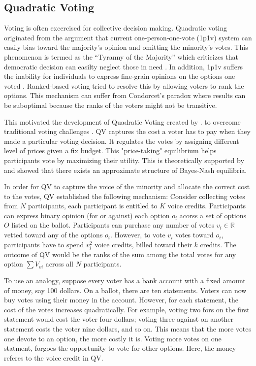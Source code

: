 \subsection{Quadratic Voting}
Voting is often excercised
for collective decision making.
Quadratic voting originated 
from the argument
that current one-person-one-vote (1p1v) system
can easily bias toward the majority's opinion
and omitting the minority's votes.
This phenomenon is termed as 
the ``Tyranny of the Majority''
which criticizes that democratic decision
can easilty neglect those in need 
\cite{posner2018radical}.
In addition, 1p1v suffers the inability
for individuals to express fine-grain opinions
on the options one voted \cite{sep-voting-methods}.
Ranked-based voting tried to resolve this
by allowing voters to rank the options.
This mechanism can
suffer from Condorcet's paradox 
where results can be suboptimal 
because the ranks of the voters
might not be transitive\cite{easley2012networks, sep-voting-methods}.

This motivated the development of Quadratic Voting
created by \textcite{posner2018radical}. 
to overcome traditional voting challenges .
QV captures the cost a voter has to pay
when they made a particular voting decision.
It regulates the votes by assigning different level of prices
given a fix budget.
This "price-taking" equilibrium helps
participants vote by maximizing their utility.
This is theoretically supported by \textcite{lalley2018quadratic}
and showed that there exists an approximate structure of Bayes-Nash equilibria.

In order for QV to capture the voice of the minority
and allocate the correct cost to the votes,
QV established the following mechanism:
Consider collecting votes from $N$ participants,
each participant is entitled to 
$K$ voice credits.
Participants can express binary opinion (for or against)
each option $o_i$ acorss a set of options $O$ listed on the ballot. 
Participants can purchase any number of votes $v_i \in \mathbb{R}$
vetted toward any of the options $o_i$.
However, to vote $v_i$ votes toward $o_i$,
participants have to spend $v_i^2$ voice credits,
billed toward their $k$ credits.
The outcome of QV 
would be the ranks of the sum
among the total votes for any option $\sum{V_{oi}}$
across all $N$ participants.

To use an analogy,
suppose every voter has a bank account 
with a fixed amount of money, say 100 dollars.
On a ballot, there are ten statements.
Voters can now buy votes using their money in the account.
However, for each statement, the cost of the votes
increases quadratically. 
For example, voting two fors on the first statement 
would cost the voter four dollars;
voting three against on another statement 
costs the voter nine dollars, and so on.
This means that the more votes one devote to an option,
the more costly it is.
Voting more votes on one statment, 
forgoes the opportunity to vote for other options.
Here, the money referes to the voice credit in QV.

